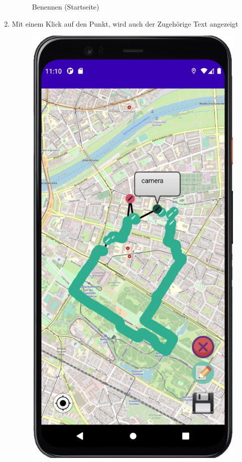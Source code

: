\documentclass{article}
\begin{document}
\begin{enumerate}
\begin{figure}[H]
		 		\centering
		 		\caption{Benennen (Startseite)}
			\endminipage
		\end{figure}
		\item Mit einem Klick auf den Punkt, wird auch der Zugehörige Text angezeigt
		\begin{figure}[H]
			\includegraphics[scale=0.9]{spoi_pic4.png}

\end{figure}
\end{enumerate}
\end{document}
